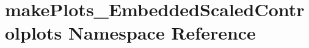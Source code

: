\hypertarget{namespacemakePlots__EmbeddedScaledControlplots}{
\section{makePlots\_\-EmbeddedScaledControlplots Namespace Reference}
\label{namespacemakePlots__EmbeddedScaledControlplots}
}
